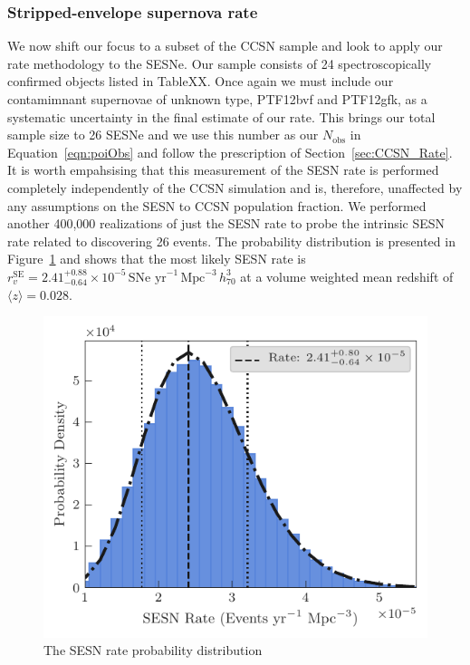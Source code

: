 \documentclass[a4paper,fleqn,usenatbib]{mnras}
\begin{document}
\subsubsection{Stripped-envelope supernova rate}
\label{SESN_Rate}

We now shift our focus to a subset of the CCSN sample and look to apply our rate methodology to the SESNe. Our sample consists of 24 spectroscopically confirmed objects listed in TableXX. Once again we must include our contamimnant supernovae of unknown type, PTF12bvf and PTF12gfk, as a systematic uncertainty in the final estimate of our rate. This brings our total sample size to 26 SESNe and we use this number as our $N_\mathrm{obs}$ in Equation~\ref{eqn:poiObs} and follow the prescription of Section~\ref{sec:CCSN_Rate}. It is worth empahsising that this measurement of the SESN rate is performed completely independently of the CCSN simulation and is, therefore, unaffected by any assumptions on the SESN to CCSN population fraction. We performed another 400,000 realizations of just the SESN rate to probe the intrinsic SESN rate related to discovering 26 events. The probability distribution is presented in Figure~\ref{fig:SESNrateProbDist} and shows that the most likely SESN rate is $r^\mathrm{SE}_v=2.41_{-0.64}^{+0.88}\times10^{-5}\,\text{SNe yr}^{-1}\,\text{Mpc}^{-3}\, h_{70}^{3}$ at a volume weighted mean redshift of $ \langle z \rangle = 0.028$.

\begin{figure}
	\includegraphics[width=\linewidth]{./SESN_Rate.pdf}
    \caption{The SESN rate probability distribution}
    \label{fig:SESNrateProbDist}
\end{figure}
\end{document}
